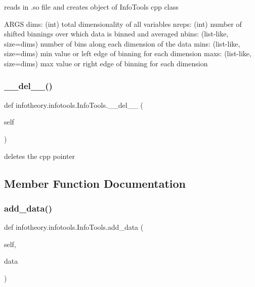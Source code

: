 \begin{DoxyVerb}reads in .so file and creates object of InfoTools cpp class

ARGS
dims: (int) total dimensionality of all variables
nreps: (int) number of shifted binnings over which data is binned and averaged
nbins: (list-like, size=dims) number of bins along each dimension of the data
mins: (list-like, size=dims) min value or left edge of binning for each dimension
maxs: (list-like, size=dims) max value or right edge of binning for each dimension
\end{DoxyVerb}
 \mbox{\label{classinfotheory_1_1infotools_1_1_info_tools_a702d0595303876470eec677c2d3807c8}} 
\subsubsection{\texorpdfstring{\+\_\+\+\_\+del\+\_\+\+\_\+()}{\_\_del\_\_()}}
{\footnotesize\ttfamily def infotheory.\+infotools.\+Info\+Tools.\+\_\+\+\_\+del\+\_\+\+\_\+ (\begin{DoxyParamCaption}\item[{}]{self }\end{DoxyParamCaption})}

\begin{DoxyVerb}deletes the cpp pointer \end{DoxyVerb}
 

\subsection{Member Function Documentation}
\mbox{\label{classinfotheory_1_1infotools_1_1_info_tools_a7a424c5612b0bd7f9e06358283bab828}} 
\subsubsection{\texorpdfstring{add\+\_\+data()}{add\_data()}}
{\footnotesize\ttfamily def infotheory.\+infotools.\+Info\+Tools.\+add\+\_\+data (\begin{DoxyParamCaption}\item[{}]{self,  }\item[{}]{data }\end{DoxyParamCaption})}

